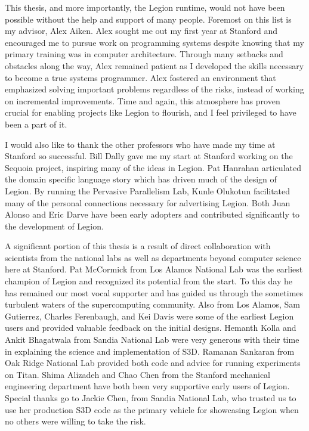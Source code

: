 
\label{sec:acknowledgement}


This thesis, and more importantly, the Legion runtime, 
would not have been possible without the help and support
of many people. Foremost on this list is my advisor, Alex
Aiken. Alex sought me out my first year at Stanford and 
encouraged me to pursue work on programming systems 
despite knowing that my primary training was in computer
architecture. Through many setbacks and obstacles along
the way, Alex remained patient as I developed the skills 
necessary to become a true systems programmer. Alex 
fostered an environment that emphasized solving important
problems regardless of the risks, instead of working 
on incremental improvements. Time and again, this atmosphere has 
proven crucial for enabling projects like Legion to flourish, 
and I feel privileged to have been a part of it.

I would also like to thank the other professors who
have made my time at Stanford so successful. Bill Dally gave 
me my start at Stanford working on the Sequoia project, inspiring 
many of the ideas in Legion. Pat Hanrahan articulated
the domain specific language story which has driven much of
the design of Legion. By running the Pervasive Parallelism
Lab, Kunle Olukotun facilitated many of the personal connections
necessary for advertising Legion. Both Juan Alonso and Eric Darve
have been early adopters and contributed significantly to the
development of Legion.

A significant portion of this thesis is a result of direct
collaboration with scientists from the national labs as well 
as departments beyond computer science here at Stanford.
Pat McCormick from Los Alamos National Lab was the earliest
champion of Legion and recognized its potential from the start. 
To this day he has remained our most vocal 
supporter and has guided us through the sometimes turbulent
waters of the supercomputing community. Also from Los Alamos,
Sam Gutierrez, Charles Ferenbaugh, and Kei Davis were some of 
the earliest Legion users and provided valuable feedback on the 
initial designs. Hemanth Kolla and Ankit Bhagatwala from Sandia 
National Lab were very generous with their time in explaining 
the science and implementation of S3D. Ramanan Sankaran from Oak Ridge
National Lab provided both code and advice for running
experiments on Titan. Shima Alizadeh and Chao Chen from the
Stanford mechanical engineering department have both been
very supportive early users of Legion. Special thanks go to 
Jackie Chen, from Sandia National Lab, who trusted us to use her production S3D 
code as the primary vehicle for showcasing Legion when no others 
were willing to take the risk. 

